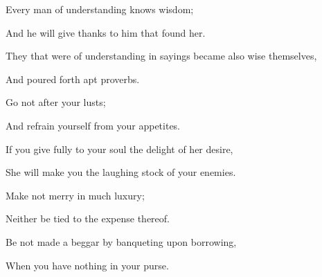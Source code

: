 {
\par }{\Q {}Every man of understanding knows wisdom;
\par }{\Q And he will give thanks to him that found her.
\par }{\Q {}They that were of understanding in sayings became also wise themselves,
\par }{\Q And poured forth apt proverbs.
\par }{\BB \par }{\Q {}Go not after your lusts;
\par }{\Q And refrain yourself from your appetites.
\par }{\Q {}If you give fully to your soul the delight of her desire,
\par }{\Q She will make you
 the laughing stock of your enemies.
\par }{\Q {}Make not merry in much luxury;
\par }{\Q Neither be tied to the expense thereof.
\par }{\Q {}Be not made a beggar by banqueting upon borrowing,
\par }{\Q When you have nothing in your purse.
\par }{\BB \par }

